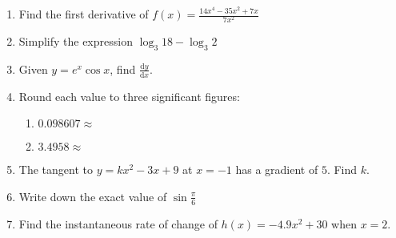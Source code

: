 \documentclass[12pt, oneside]{article}
\begin{document}
\begin{enumerate}
  \item Find the first derivative of $\displaystyle f(x)=\frac{14x^4 - 35x^2 + 7x}{7x^2}$ \vspace{5cm}
  \item Simplify the expression $\log_3 18 - \log_3 2$ \vspace{3cm}
  \item Given $y=e^x \cos x$, find $\displaystyle \frac{\mathrm{d}y}{\mathrm{d}x}$. \vspace{6cm}
  \item Round each value to three significant figures:
  \begin{enumerate}
    \item $0.098607 \approx$ \vspace{2cm}
    \item $3.4958 \approx$
  \end{enumerate}
  \newpage
  \item The tangent to $y=kx^2-3x+9$ at $x=-1$ has a gradient of $5$. Find $k$. \vspace{8cm}
  \item Write down the exact value of $\displaystyle \sin \frac{\pi}{6}$ \vspace{3cm}
  \item Find the instantaneous rate of change of $h(x)=-4.9x^2+30$ when $x=2$.

\end{enumerate}
\end{document}
